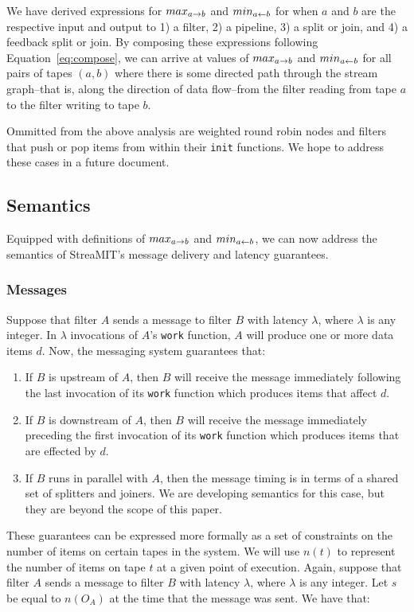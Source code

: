 We have derived expressions for $max_{a \rightarrow b}$ and $min_{a \leftarrow b}$ for when
$a$ and $b$ are the respective input and output to 1) a filter, 2) a
pipeline, 3) a split or join, and 4) a feedback split or join.  By
composing these expressions following Equation~\ref{eq:compose}, we
can arrive at values of $max_{a \rightarrow b}$ and $min_{a \leftarrow b}$ for all pairs of
tapes $(a, b)$ where there is some directed path through the stream
graph--that is, along the direction of data flow--from the filter
reading from tape $a$ to the filter writing to tape $b$.  

Ommitted from the above analysis are weighted round robin nodes and
filters that push or pop items from within their {\tt init} functions.
We hope to address these cases in a future document.

\subsection{Semantics}

Equipped with definitions of $max_{a \rightarrow b}$ and $min_{a \leftarrow b}$, we can now
address the semantics of StreaMIT's message delivery and latency
guarantees.

\subsubsection{Messages}

Suppose that filter $A$ sends a message to filter $B$ with latency
$\lambda$, where $\lambda$ is any integer.  In $\lambda$ invocations
of $A$'s {\tt work} function, $A$ will produce one or more data items
$d$.  Now, the messaging system guarantees that:
\begin{enumerate}
\item If $B$ is upstream of $A$, then $B$ will receive the message
immediately following the last invocation of its {\tt work} function
which produces items that affect $d$.

\item If $B$ is downstream of $A$, then $B$ will receive the message
immediately preceding the first invocation of its {\tt work} function
which produces items that are effected by $d$.

\item If $B$ runs in parallel with $A$, then the message timing is in terms
of a shared set of splitters and joiners.  We are developing semantics
for this case, but they are beyond the scope of this paper.
\end{enumerate}
These guarantees can be expressed more formally as a set of
constraints on the number of items on certain tapes in the system.  We
will use $n(t)$ to represent the number of items on tape $t$ at a
given point of execution.  Again, suppose that filter $A$ sends a
message to filter $B$ with latency $\lambda$, where $\lambda$ is any
integer.  Let $s$ be equal to $n(O_A)$ at the time that the message
was sent.  We have that:

